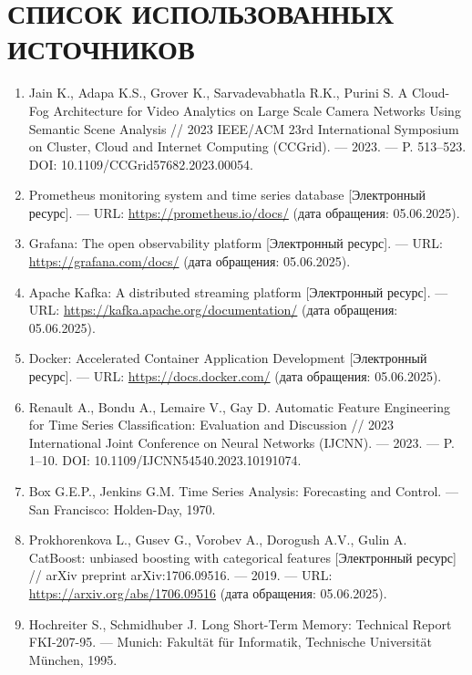 \chapter*{СПИСОК ИСПОЛЬЗОВАННЫХ ИСТОЧНИКОВ}


\begin{enumerate}[label=\arabic*)\hspace{1em}, leftmargin=1cm, itemsep=0em]
	\item Jain K., Adapa K.S., Grover K., Sarvadevabhatla R.K., Purini S. A Cloud-Fog Architecture for Video Analytics on Large Scale Camera Networks Using Semantic Scene Analysis // 2023 IEEE/ACM 23rd International Symposium on Cluster, Cloud and Internet Computing (CCGrid). — 2023. — P. 513–523. DOI: 10.1109/CCGrid57682.2023.00054.
	\item Prometheus monitoring system and time series database [Электронный ресурс]. — URL: \url{https://prometheus.io/docs/} (дата обращения: 05.06.2025).
	\item Grafana: The open observability platform [Электронный ресурс]. — URL: \url{https://grafana.com/docs/} (дата обращения: 05.06.2025).
	\item Apache Kafka: A distributed streaming platform [Электронный ресурс]. — URL: \url{https://kafka.apache.org/documentation/} (дата обращения: 05.06.2025).
	\item Docker: Accelerated Container Application Development [Электронный ресурс]. — URL: \url{https://docs.docker.com/} (дата обращения: 05.06.2025).
	\item Renault A., Bondu A., Lemaire V., Gay D. Automatic Feature Engineering for Time Series Classification: Evaluation and Discussion // 2023 International Joint Conference on Neural Networks (IJCNN). — 2023. — P. 1–10. DOI: 10.1109/IJCNN54540.2023.10191074.
	\item Box G.E.P., Jenkins G.M. Time Series Analysis: Forecasting and Control. — San Francisco: Holden-Day, 1970.
	\item Prokhorenkova L., Gusev G., Vorobev A., Dorogush A.V., Gulin A. CatBoost: unbiased boosting with categorical features [Электронный ресурс] // arXiv preprint arXiv:1706.09516. — 2019. — URL: \url{https://arxiv.org/abs/1706.09516} (дата обращения: 05.06.2025).
	\item Hochreiter S., Schmidhuber J. Long Short-Term Memory: Technical Report FKI-207-95. — Munich: Fakultät für Informatik, Technische Universität München, 1995.

\end{enumerate}

